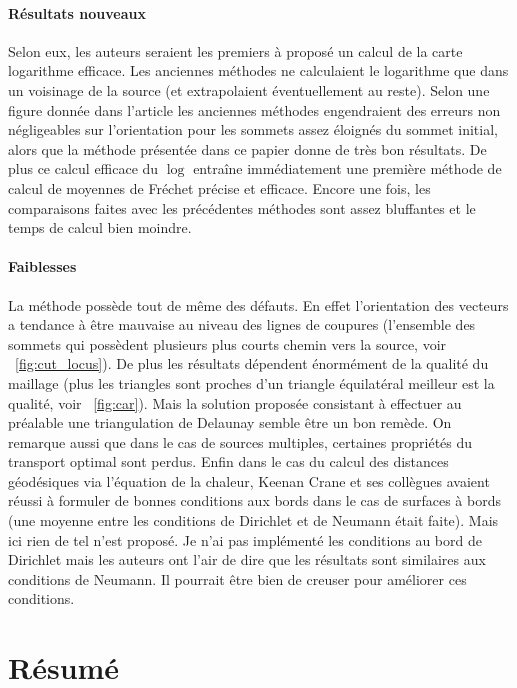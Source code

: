 \documentclass[11pt]{article}
\begin{document}
	\paragraph{Résultats nouveaux}
	Selon eux, les auteurs seraient les premiers à proposé un calcul de la carte logarithme efficace. Les anciennes méthodes ne calculaient le logarithme que dans un voisinage de la source (et extrapolaient éventuellement au reste). Selon une figure donnée dans l'article les anciennes méthodes engendraient des erreurs non négligeables sur l'orientation pour les sommets assez éloignés du sommet initial, alors que la méthode présentée dans ce papier donne de très bon résultats. De plus ce calcul efficace du $\log$ entraîne immédiatement une première méthode de calcul de moyennes de Fréchet précise et efficace. Encore une fois, les comparaisons faites avec les précédentes méthodes sont assez bluffantes et le temps de calcul bien moindre.
	
	\paragraph{Faiblesses}
	La méthode possède tout de même des défauts. En effet l'orientation des vecteurs a tendance à être mauvaise au niveau des lignes de coupures (l'ensemble des sommets qui possèdent plusieurs plus courts chemin vers la source, voir \figurename~\ref{fig:cut_locus}). De plus les résultats dépendent énormément de la qualité du maillage (plus les triangles sont proches d'un triangle équilatéral meilleur est la qualité, voir \figurename~\ref{fig:car}). Mais la solution proposée consistant à effectuer au préalable une triangulation de Delaunay semble être un bon remède. On remarque aussi que dans le cas de sources multiples, certaines propriétés du transport optimal sont perdus. Enfin dans le cas du calcul des distances géodésiques via l'équation de la chaleur, Keenan Crane et ses collègues avaient réussi à formuler de bonnes conditions aux bords dans le cas de surfaces à bords (une moyenne entre les conditions de Dirichlet et de Neumann était faite). Mais ici rien de tel n'est proposé. Je n'ai pas implémenté les conditions au bord de Dirichlet mais les auteurs ont l'air de dire que les résultats sont similaires aux conditions de Neumann. Il pourrait être bien de creuser pour améliorer ces conditions.
	
	\section{Résumé}
	
\end{document}
